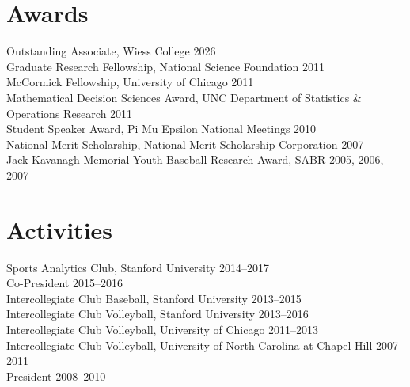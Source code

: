\documentclass{article}
\begin{document}
\section*{\sc Awards}

Outstanding Associate, Wiess College \hfill 2026\\
Graduate Research Fellowship, National Science Foundation \hfill 2011\\
McCormick Fellowship, University of Chicago \hfill 2011\\
Mathematical Decision Sciences Award, UNC Department of Statistics \& Operations Research \hfill 2011\\
Student Speaker Award, Pi Mu Epsilon National Meetings \hfill 2010\\
National Merit Scholarship, National Merit Scholarship Corporation \hfill 2007\\
Jack Kavanagh Memorial Youth Baseball Research Award, SABR \hfill 2005, 2006, 2007

\section*{\sc Activities}

Sports Analytics Club, Stanford University \hfill 2014--2017\\
{\color{gray} \indent Co-President \hfill 2015--2016}\\
Intercollegiate Club Baseball, Stanford University \hfill 2013--2015\\
Intercollegiate Club Volleyball, Stanford University \hfill 2013--2016\\
Intercollegiate Club Volleyball, University of Chicago \hfill 2011--2013\\
Intercollegiate Club Volleyball, University of North Carolina at Chapel Hill \hfill 2007--2011\\
{\color{gray} \indent President \hfill 2008--2010}
\end{document}
